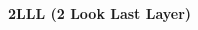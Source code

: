 \documentclass[landscape,a4paper]{article}
\begin{document}
\begin{center}
	{\Huge{\textbf{2LLL (2 Look Last Layer)}}}
\end{center}
\begin{multicols}{2}


\end{multicols}
\end{document}
